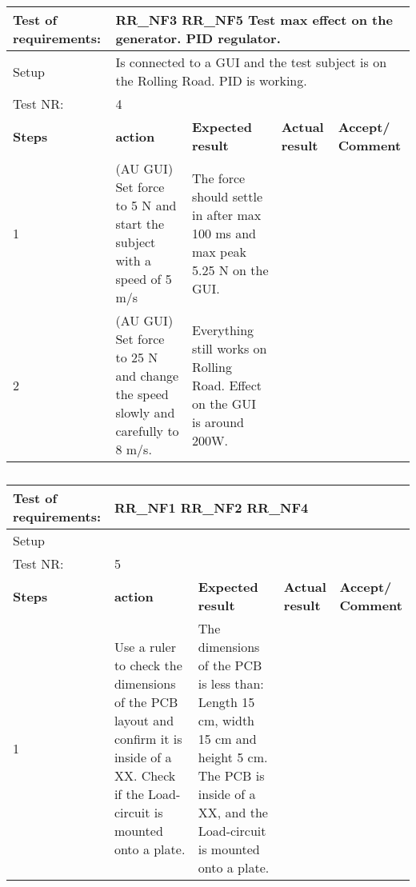 \begin{table}[h!]
	\centering
	\label{my-label}	
	\begin{tabular}{|p{1.5 cm}|p{4.2 cm}|p{2.1 cm}|p{2.1 cm}|p{2.1 cm}|}
		\hline
		Test of requirements: 
		& \multicolumn{4}{l|}{RR\_NF3 RR\_NF5  Test max effect on the generator.	PID regulator.} \\ \hline
		Setup 
		& \multicolumn{4}{l|}{Is connected to a GUI and the test subject is on the Rolling Road. PID is working.} \\ \hline
		Test NR:
		& \multicolumn{4}{l|}{4} \\ \hline
		\textbf{Steps} & \textbf{action} & \textbf{Expected result} & 
		\textbf{Actual result} & \textbf{Accept/ Comment} \\ \hline
		1 
		& (AU GUI) Set force to 5 N and start the subject with a speed of 5 m/s  
		& The force should settle in after max 100 ms and max peak 5.25 N on the GUI.  
		&
		& \\ \hline
		2
		& (AU GUI) Set force to 25 N and change the speed slowly and carefully to 8 m/s.
		& Everything still works on Rolling Road. Effect on the GUI is around 200W.
		&
		& \\ \hline
	\end{tabular}
	\caption{}
\end{table}

\begin{table}[h!]
	\centering
	\label{my-label}	
	\begin{tabular}{|p{1.5 cm}|p{4.2 cm}|p{2.1 cm}|p{2.1 cm}|p{2.1 cm}|}
		\hline
		Test of requirements: 
		& \multicolumn{4}{l|}{RR\_NF1 RR\_NF2 RR\_NF4} \\ \hline
		Setup 
		& \multicolumn{4}{l|}{} \\ \hline
		Test NR:
		& \multicolumn{4}{l|}{5} \\ \hline
		\textbf{Steps} & \textbf{action} & \textbf{Expected result} & 
		\textbf{Actual result} & \textbf{Accept/ Comment} \\ \hline
		1 
		& Use a ruler to check the dimensions of the PCB layout and confirm it is inside of a XX. Check if the Load-circuit is mounted onto a plate.
		& The dimensions of the PCB is less than: Length 15 cm, width 15 cm and height 5 cm. The PCB is inside of a XX, and the Load-circuit is mounted onto a plate.
		&
		& \\ \hline
	\end{tabular}
	\caption{}
\end{table}

